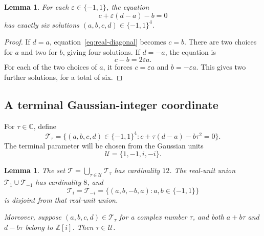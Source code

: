 \documentclass[11pt]{amsart}
\newtheorem{lemma}[theorem]{Lemma}
\theoremstyle{definition}
\theoremstyle{remark}
\newcommand{\Z}{\mathbb Z}
\newcommand{\C}{\mathbb C}
\newcommand{\U}{\mathcal U}
\numberwithin{equation}{section}
\begin{document}
\begin{lemma}\label{lem:real-six}
For each $\varepsilon\in\{-1,1\}$, the equation
\begin{equation}\label{eq:real-diagonal}
 c+\varepsilon(d-a)-b=0
\end{equation}
has exactly six solutions $(a,b,c,d)\in\{-1,1\}^4$.
\end{lemma}

\begin{proof}
If $d=a$, equation~\eqref{eq:real-diagonal} becomes $c=b$. There are two choices for $a$ and two for $b$, giving four solutions. If $d=-a$, the equation is
\[
 c-b=2\varepsilon a.
\]
For each of the two choices of $a$, it forces $c=\varepsilon a$ and $b=-\varepsilon a$. This gives two further solutions, for a total of six.
\end{proof}

\subsection{A terminal Gaussian-integer coordinate}

For $\tau\in\C$, define
\begin{equation}\label{eq:terminal-set}
 \mathcal T_\tau
 =\{(a,b,c,d)\in\{-1,1\}^4:
 c+\tau(d-a)-b\tau^2=0\}.
\end{equation}
The terminal parameter will be chosen from the Gaussian units
\[
 \U=\{1,-1,i,-i\}.
\]

\begin{lemma}\label{lem:terminal}
The set $\mathcal T=\bigcup_{\tau\in\U}\mathcal T_\tau$ has cardinality $12$. The real-unit union $\mathcal T_1\cup\mathcal T_{-1}$ has cardinality $8$, and
\begin{equation}\label{eq:imaginary-set}
 \mathcal T_i=\mathcal T_{-i}
 =\{(a,b,-b,a):a,b\in\{-1,1\}\}
\end{equation}
is disjoint from that real-unit union.

Moreover, suppose $(a,b,c,d)\in\mathcal T_\tau$ for a complex number $\tau$, and both $a+b\tau$ and $d-b\tau$ belong to $\Z[i]$. Then $\tau\in\U$.
\end{lemma}
\end{document}
